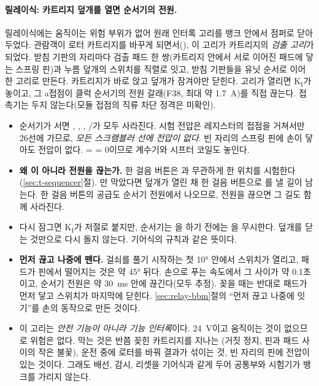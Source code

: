 \paragraph{릴레이식: 카트리지 덮개를 열면 순서기의 전원.} 릴레이식에는 움직이는 위험 부위가 없어 원래 인터록 고리를 뱅크 안에서
점퍼로 닫아 두었다. 관람객이 로터 카트리지를 바꾸게 되면서(), 이 고리가 카트리지의 \emph{검출 고리}가 되었다.
받침 기판의 자리마다 검출 패드 한 쌍(카트리지 안에서 서로 이어진 패드에 닿는 스프링 핀)과 누름 덮개의 스위치를 직렬로 잇고, 받침
기판들을 유닛 순서로 이어 한 고리로 만든다. 카트리지가 바로 앉고 덮개가 잠겨야만 닫힌다. 고리가 열리면 K$_\mathrm{I}$가 놓이고, 그
a접점이 클럭 순서기의 전원 갈래(F38, 최대 약 1.7~A)를 직접 끊는다. 접촉기는 두지 않는다(모듈 접점의 직류 차단 정격은 미확인).
\begin{itemize}
\item 순서기가 서면 , , , /가 모두 사라진다. 시험 전압은 레지스터의
 접점을 거쳐서만 26선에 가므로, \emph{모든 스크램블러 선에 전압이 없다}. 빈 자리의 스프링 핀에 손이 닿아도 전압이 없다.
 =  = 0이므로 계수기와 시프터 코일도 놓인다.
\item \textbf{왜 이 아니라 전원을 끊는가.} 한 걸음 버튼은 과 무관하게 한 위치를 시험한다(\ref{sec:t-sequencer}절).
만 막았다면 덮개가 열린 채 한 걸음 버튼으로 를 낼 길이 남는다. 한 걸음 버튼의 공급도 순서기 전원에서 나오므로,
전원을 끊으면 그 길도 함께 사라진다.
\item 다시 잠그면 K$_\mathrm{I}$가 저절로 붙지만, 순서기는 을 하기 전에는 을 무시한다. 덮개를 닫는 것만으로 다시
돌지 않는다. 기어식의  규칙과 같은 뜻이다.
\item \textbf{먼저 끊고 나중에 뗀다.} 걸쇠를 풀기 시작하는 첫 10° 안에서 스위치가 열리고, 패드가 핀에서 떨어지는 것은 약 45° 뒤다. 손으로
푸는 속도에서 그 사이가 약 0.1초이고, 순서기 전원은 약 30~ms 안에 끊긴다(모두 추정). 꽂을 때는 반대로 패드가 먼저 닿고 스위치가
마지막에 닫힌다. \ref{sec:relay-bbm}절의 ``먼저 끊고 나중에 잇기''를 손의 동작으로 만든 것이다.
\item 이 고리는 \emph{안전 기능이 아니라 기능 인터록}이다. 24~V이고 움직이는 것이 없으므로 위험은 없다. 막는 것은 반쯤 꽂힌 카트리지를
지나는 (거짓 정지, 핀과 패드 사이의 작은 불꽃), 운전 중에 로터를 바꿔 결과가 섞이는 것, 빈 자리의 핀에 전압이 있는 것이다.
그래도 배선, 감시, 리셋을 기어식과 같게 두어 공통부와 시험기가 뱅크를 가리지 않는다.
\end{itemize}

